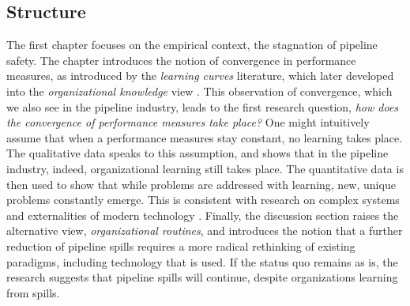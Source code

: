\subsection{Structure}

The first chapter focuses on the empirical context, the stagnation of pipeline safety. The chapter introduces the notion of convergence in performance measures, as introduced by the \textit{learning curves} literature, which later developed into the \textit{organizational knowledge} view \citep{Argote2013-1}. This observation of convergence, which we also see in the pipeline industry, leads to the first research question, \textit{how does the convergence of performance measures take place?} One might intuitively assume that when a performance measures stay constant, no learning takes place. The qualitative data speaks to this assumption, and shows that in the pipeline industry, indeed, organizational learning still takes place. The quantitative data is then used to show that while problems are addressed with learning, new, unique problems constantly emerge. This is consistent with research on complex systems and externalities of modern technology \citep{Beck1992, Perrow1984}. Finally, the discussion section raises the alternative view, \textit{organizational routines}, and introduces the notion that a further reduction of pipeline spills requires a more radical rethinking of existing paradigms, including technology that is used. If the status quo remains as is, the research suggests that pipeline spills will continue, despite organizations learning from spills.


